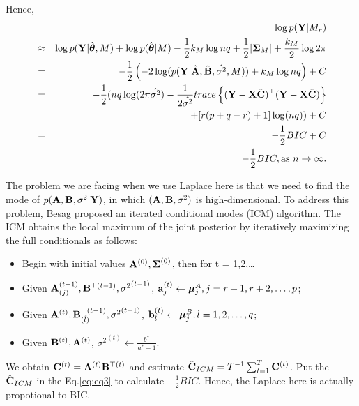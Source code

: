 \documentclass[]{book}
\providecommand{\tightlist}{%
  \setlength{\itemsep}{0pt}\setlength{\parskip}{0pt}}
\begin{document}
Hence,
\begin{eqnarray}
&&\log p({\bf Y}|M_r) \nonumber\\
&\approx& \log p({\bf Y}|\hat{{\boldsymbol \theta}},M) + \log p(\hat{\boldsymbol \theta}|M) -\frac{1}{2}k_M\log nq +\frac{1}{2}|{\boldsymbol \Sigma}_M|
+ \frac{k_M}{2}\log 2\pi\nonumber\\
&=&-\frac{1}{2} \left(-2\log(p({\bf Y}|\hat{{\bf A}},\hat{{\bf B}},\hat{\sigma^2},M)) + k_M \log nq\right)  +C\nonumber\\
&=&-\frac{1}{2}(nq\log(2\pi\hat{\sigma^2})-
\frac{1}{2\hat{\sigma^2}} trace\left\{({\bf Y}-{\bf X}\hat{\bf C})^{{\top}}({\bf Y}-{\bf X}\hat{\bf C}) \right\} \nonumber\\
&&+ [r(p+q-r)+1] \log(nq))+C\nonumber\\
&=& -\frac{1}{2}BIC + C\nonumber\\
&=& -\frac{1}{2}BIC, \text{as } n\rightarrow \infty.
\label{eq:eq3}
\end{eqnarray}

The problem we are facing when we use Laplace here is that we need to find the mode of \(p({\bf A},{\bf B},\sigma^2|{\bf Y})\), in which \(({\bf A},{\bf B},\sigma^2)\) is high-dimensional. To address this problem, Besag proposed an iterated conditional modes (ICM) algorithm. The ICM obtains the local maximum of the joint posterior by iteratively maximizing the full conditionals as follows:

\begin{itemize}
\tightlist
\item
  Begin with initial values \({\bf A}^{(0)},{\boldsymbol \Sigma}^{(0)}\), then for t = 1,2,\ldots{}
\item
  Given \({\bf A}_{(j)}^{(t-1)},{\bf B}^{{\top}(t-1)}, {\sigma^2}^{(t-1)}\), \({\bf a}_j^{(t)}\leftarrow{\boldsymbol \mu}_j^A,j=r+1,r+2,\ldots,p\);
\item
  Given \({\bf A}^{(t)},{\bf B}^{{\top}(t-1)}_{(\tilde{l})}, {\sigma^2}^{(t-1)}\), \({\bf b}_l^{(t)}\leftarrow{\boldsymbol \mu}_j^B,l=1,2,\ldots,q\);
\item
  Given \({\bf B}^{(t)}, {\bf A}^{(t)}\), \({\sigma^2}^{(t)}\leftarrow\frac{b^*}{a^*-1}\).
\end{itemize}

We obtain \({\bf C}^{(t)}={\bf A}^{(t)}{\bf B}^{{\top}(t)}\) and estimate \(\hat{{\bf C}}_{ICM}=T^{-1}\sum_{t=1}^{T}{\bf C}^{(t)}\). Put the \(\hat{{\bf C}}_{ICM}\) in the Eq.\eqref{eq:eq3} to calculate \(-\frac{1}{2}BIC\). Hence, the Laplace here is actually propotional to BIC.
\end{document}
